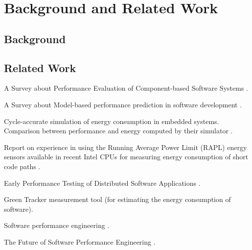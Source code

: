 \chapter{Background and Related Work}
\label{rel_work}

\section{Background}


\section{Related Work}
A Survey about Performance Evaluation of Component-based Software Systems \cite{koziolek2010performance}.

A Survey about Model-based performance prediction in software development \cite{balsamo2004model}.

Cycle-accurate simulation of energy consumption in embedded systems. Comparison between performance and energy computed by their simulator \cite{simunic1999cycle}.

Report on experience in using the Running Average Power Limit (RAPL) energy sensors available in recent Intel CPUs for measuring energy consumption
of short code paths \cite{hahnel2012measuring}.

Early Performance Testing of Distributed Software Applications \cite{denaro2004early}.

Green Tracker measurement tool (for estimating the energy consumption of software)\cite{amsel2010green}.

Software performance engineering \cite{smith1993software}.

The Future of Software Performance Engineering \cite{woodside2007future}.

